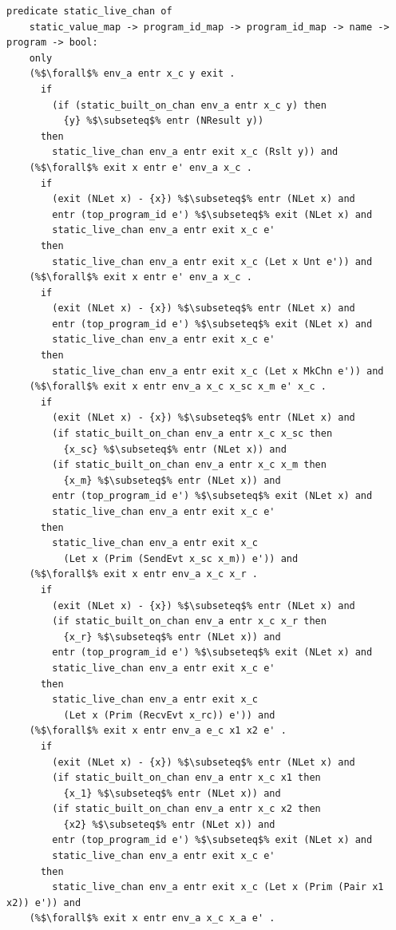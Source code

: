 \documentclass{article}
\begin{document}
\begin{lstlisting}[language=logic, escapechar=\%]
  predicate static_live_chan of
    static_value_map -> program_id_map -> program_id_map -> name -> program -> bool:
    only
    (%$\forall$% env_a entr x_c y exit .
      if
        (if (static_built_on_chan env_a entr x_c y) then
          {y} %$\subseteq$% entr (NResult y))
      then
        static_live_chan env_a entr exit x_c (Rslt y)) and
    (%$\forall$% exit x entr e' env_a x_c .
      if 
        (exit (NLet x) - {x}) %$\subseteq$% entr (NLet x) and
        entr (top_program_id e') %$\subseteq$% exit (NLet x) and
        static_live_chan env_a entr exit x_c e'
      then 
        static_live_chan env_a entr exit x_c (Let x Unt e')) and
    (%$\forall$% exit x entr e' env_a x_c .
      if
        (exit (NLet x) - {x}) %$\subseteq$% entr (NLet x) and
        entr (top_program_id e') %$\subseteq$% exit (NLet x) and
        static_live_chan env_a entr exit x_c e'
      then 
        static_live_chan env_a entr exit x_c (Let x MkChn e')) and
    (%$\forall$% exit x entr env_a x_c x_sc x_m e' x_c .
      if
        (exit (NLet x) - {x}) %$\subseteq$% entr (NLet x) and
        (if static_built_on_chan env_a entr x_c x_sc then
          {x_sc} %$\subseteq$% entr (NLet x)) and
        (if static_built_on_chan env_a entr x_c x_m then 
          {x_m} %$\subseteq$% entr (NLet x)) and
        entr (top_program_id e') %$\subseteq$% exit (NLet x) and
        static_live_chan env_a entr exit x_c e'
      then
        static_live_chan env_a entr exit x_c
          (Let x (Prim (SendEvt x_sc x_m)) e')) and
    (%$\forall$% exit x entr env_a x_c x_r .    
      if
        (exit (NLet x) - {x}) %$\subseteq$% entr (NLet x) and
        (if static_built_on_chan env_a entr x_c x_r then
          {x_r} %$\subseteq$% entr (NLet x)) and
        entr (top_program_id e') %$\subseteq$% exit (NLet x) and
        static_live_chan env_a entr exit x_c e'
      then
        static_live_chan env_a entr exit x_c
          (Let x (Prim (RecvEvt x_rc)) e')) and
    (%$\forall$% exit x entr env_a e_c x1 x2 e' .
      if
        (exit (NLet x) - {x}) %$\subseteq$% entr (NLet x) and
        (if static_built_on_chan env_a entr x_c x1 then
          {x_1} %$\subseteq$% entr (NLet x)) and
        (if static_built_on_chan env_a entr x_c x2 then
          {x2} %$\subseteq$% entr (NLet x)) and
        entr (top_program_id e') %$\subseteq$% exit (NLet x) and
        static_live_chan env_a entr exit x_c e'
      then
        static_live_chan env_a entr exit x_c (Let x (Prim (Pair x1 x2)) e')) and
    (%$\forall$% exit x entr env_a x_c x_a e' . 

\end{lstlisting}
\end{document}
